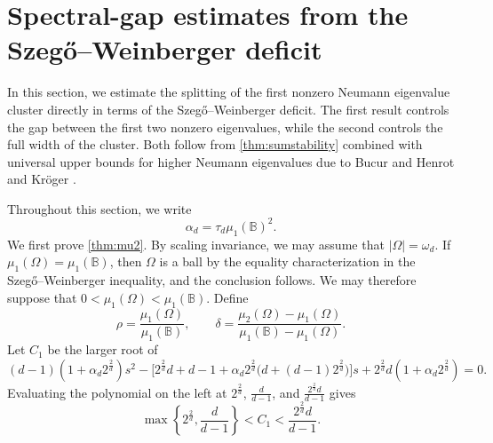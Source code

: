 \documentclass{amsart}
\numberwithin{equation}{section}
\theoremstyle{plain}
\theoremstyle{definition}
\theoremstyle{plain}
\theoremstyle{remark}
\numberwithin{figure}{section}
\newcommand{\B}{\mathbb{B}}
\begin{document}
\section{Spectral-gap estimates from the Szeg\H{o}--Weinberger deficit}

In this section, we estimate the splitting of the first nonzero Neumann eigenvalue cluster directly in terms of the Szeg\H{o}--Weinberger deficit. The first result controls the gap between the first two nonzero eigenvalues, while the second controls the full width of the cluster. Both follow from \cref{thm:sumstability} combined with universal upper bounds for higher Neumann eigenvalues due to Bucur and Henrot \cite{BH19} and Kr\"oger \cite{Kro92}.

Throughout this section, we write
\[
    \alpha_d=\tau_d\mu_1(\B)^2.
\]
We first prove \cref{thm:mu2}. By scaling invariance, we may assume that $|\Omega|=\omega_d$. If $\mu_1(\Omega)=\mu_1(\B)$, then $\Omega$ is a ball by the equality characterization in the Szeg\H{o}--Weinberger inequality, and the conclusion follows. We may therefore suppose that $0<\mu_1(\Omega)<\mu_1(\B)$. Define
\[
    \rho=\frac{\mu_1(\Omega)}{\mu_1(\B)},\qquad \delta=\frac{\mu_2(\Omega)-\mu_1(\Omega)}{\mu_1(\B)-\mu_1(\Omega)}.
\]
Let $C_1$ be the larger root of
\begin{equation}
    \label{eq:C4}
    (d-1)(1+\alpha_d 2^{\frac{2}{d}} )s^2-\big[2^{\frac{2}{d}} d +d-1+\alpha_d 2^{\frac{2}{d}} \big(d+(d-1) 2^{\frac{2}{d}} \big)\big]s+2^{\frac{2}{d}} d (1+\alpha_d 2^{\frac{2}{d}} )=0.
\end{equation}
Evaluating the polynomial on the left at $2^{\frac{2}{d}}$, $\frac{d}{d-1}$, and $\frac{2^{\frac{2}{d}}d}{d-1}$ gives
\begin{equation}
    \label{eq:C4bounds}
    \max\left\{2^{\frac{2}{d}},\frac{d}{d-1}\right\}<C_1<\frac{2^{\frac{2}{d}}d}{d-1}.
\end{equation}
\end{document}
